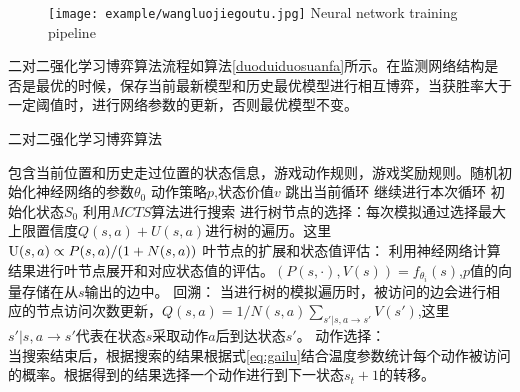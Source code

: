 \begin{figure}[htpb]
	\centering
	\texttt{[image: example/wangluojiegoutu.jpg]}
	{Neural network training pipeline}
	\label{fig:wangluojiegoutu}
\end{figure}

二对二强化学习博弈算法流程如算法\ref{duoduiduosuanfa}所示。在监测网络结构是否是最优的时候，保存当前最新模型和历史最优模型进行相互博弈，当获胜率大于一定阈值时，进行网络参数的更新，否则最优模型不变。
\begin{algorithm}[htbp]
	\caption{二对二强化学习博弈算法}%
	\label{duoduiduosuanfa}
	\begin{algorithmic}[1]%
		\Require
		包含当前位置和历史走过位置的状态信息，游戏动作规则，游戏奖励规则。随机初始化神经网络的参数$\theta_0$
		\Ensure 
		动作策略$p$,状态价值$v$
		\State 跳出当前循环
		\Else
		\State 继续进行本次循环
		\EndIf
		\State 初始化状态$S_0$
		\State 利用$MCTS$算法进行搜索
		\State 进行树节点的选择：每次模拟通过选择最大上限置信度$Q(s,a)+U(s,a)$进行树的遍历。这里${\rm{U}}(s,a) \propto P(s,a)/(1 + N(s,a))$
		\State 叶节点的扩展和状态值评估：
		利用神经网络计算结果进行叶节点展开和对应状态值的评估。$(P(s, \cdot ),V(s)) = {f_{{\theta _i}}}(s)$,$p$值的向量存储在从$s$输出的边中。
		\State 回溯：
		当进行树的模拟遍历时，被访问的边会进行相应的节点访问次数更新，$Q(s,a) = 1/N(s,a)\sum\nolimits_{s'|s,a \to s'} {V(s')} $,这里${s'|s,a \to s'}$代表在状态$s$采取动作$a$后到达状态$s'$。
		\EndWhile
		\State 动作选择：
		\\当搜索结束后，根据搜索的结果根据式\ref{eq:gailu}结合温度参数统计每个动作被访问的概率。根据得到的结果选择一个动作进行到下一状态$s_t+1$的转移。
		\EndFor
		\end{algorithmic}
		\end{algorithm}

